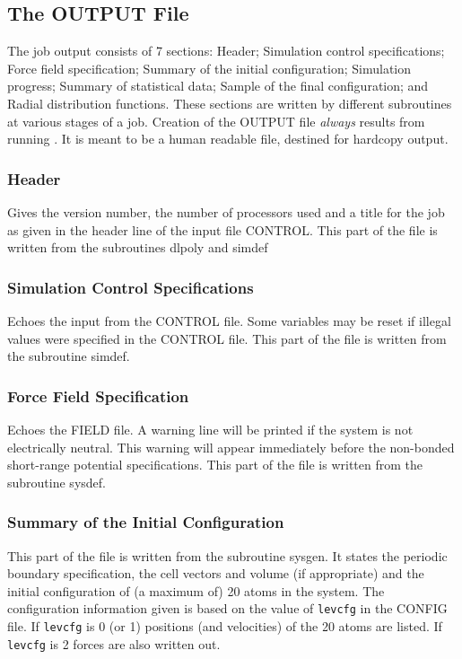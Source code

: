 \subsection{The OUTPUT File}
\label{outputfile}

The job output consists of 7 sections: Header; Simulation control
specifications; Force field specification; Summary of the initial
configuration; Simulation progress; Summary of statistical data;
Sample of the final configuration; and Radial distribution functions.
These sections are written by different subroutines at various stages
of a job. Creation of the OUTPUT file {\em always} results from
running \D{}. It is meant to be a human readable file, destined
for hardcopy output.

\subsubsection{Header}

Gives the \D{} version number, the number of processors used and a
title for the job as given in the header line of the input file
CONTROL.  This part of the file is written from the subroutines
{\sc dlpoly} and  {\sc simdef}

\subsubsection{Simulation Control Specifications}

Echoes the input from the CONTROL file. Some variables may be reset if
illegal values were specified in the CONTROL file.  This part of
the file is written from the subroutine {\sc simdef}.

\subsubsection{Force Field Specification}

Echoes the FIELD file. A warning line will be printed if the system is
not electrically neutral. This warning will appear immediately before
the non-bonded short-range potential specifications.  This part of the
file is written from the subroutine {\sc sysdef}. 

\subsubsection{Summary of the Initial Configuration}

 This part of the file is written from the subroutine {\sc sysgen}. It
states the periodic boundary specification, the cell vectors and
volume (if appropriate) and the initial configuration of (a maximum
of) 20 atoms in the system. The configuration information given is
based on the value of {\tt levcfg} in the CONFIG file. If {\tt levcfg}
is 0 (or 1) positions (and velocities) of the 20 atoms are listed. If
{\tt levcfg} is 2 forces are also written out.

